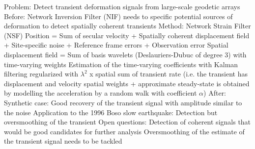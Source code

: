 \documentclass[main.tex]{subfiles}
\begin{document}
Problem: Detect transient deformation signals from large-scale geodetic arrays
Before: Network Inversion Filter (NIF) needs to specific potential sources of deformation to detect spatially coherent transients
Method: Network Strain Filter (NSF)
Position = Sum of secular velocity + Spatially coherent displacement field + Site-specific noise + Reference frame errors + Observation error
Spatial displacement field = Sum of basis wavelets (Deslauriers-Dubuc of degree 3) with time-varying weights
Estimation of the time-varying coefficients with Kalman filtering regularized with $\lambda^2$ x spatial sum of transient rate (i.e. the transient has displacement and velocity spatial weights + approximate steady-state is obtained by modelling the acceleration by a random walk with coefficient $\alpha$)
After: Synthetic case: Good recovery of the transient signal with amplitude similar to the noise
Application to the 1996 Boso slow earthquake: Detection but oversmoothing of the transient
Open questions: Detection of coherent signals that would be good candidates for further analysis
Oversmoothing of the estimate of the transient signal needs to be tackled
\end{document}
